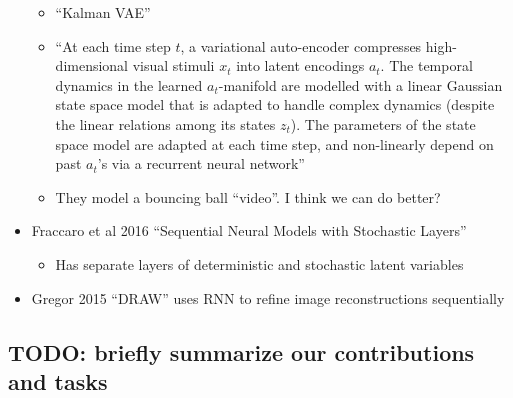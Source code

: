 \documentclass[10pt,letterpaper]{article}
\begin{document}
\begin{itemize}
\begin{itemize}
        \item ``Kalman VAE''
        \item ``At each time step $t$, a variational auto-encoder compresses high-dimensional visual stimuli $x_t$ into latent encodings $a_t$. The temporal dynamics in the learned $a_t$-manifold are modelled with a linear Gaussian state space model that is adapted to handle complex dynamics (despite the linear relations among its states $z_t$). The parameters of the state space model are adapted at each time step, and non-linearly depend on past $a_t$’s via a recurrent neural network''
        \item They model a bouncing ball ``video''. I think we can do better?
    \end{itemize}
    \item Fraccaro et al 2016 ``Sequential Neural Models with Stochastic Layers''
    \begin{itemize}
        \item Has separate layers of deterministic and stochastic latent variables
    \end{itemize}
    \item Gregor 2015 ``DRAW'' uses RNN to refine image reconstructions sequentially
\end{itemize}

\subsection*{TODO: briefly summarize our contributions and tasks}

\bigskip



\setlength{\bibleftmargin}{.125in}
\setlength{\bibindent}{-\bibleftmargin}

\end{document}
